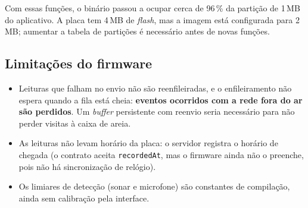 Com essas funções, o binário passou a ocupar cerca de 96\,\% da partição de 1\,MB do aplicativo. A placa tem 4\,MB de \textit{flash}, mas a imagem está configurada para 2\,MB; aumentar a tabela de partições é necessário antes de novas funções.

\subsection{Limitações do firmware}

\begin{itemize}
  \item Leituras que falham no envio não são reenfileiradas, e o enfileiramento não espera quando a fila está cheia: \textbf{eventos ocorridos com a rede fora do ar são perdidos}. Um \textit{buffer} persistente com reenvio seria necessário para não perder visitas à caixa de areia.
  \item As leituras não levam horário da placa: o servidor registra o horário de chegada (o contrato aceita \texttt{recordedAt}, mas o firmware ainda não o preenche, pois não há sincronização de relógio).
  \item Os limiares de detecção (sonar e microfone) são constantes de compilação, ainda sem calibração pela interface.
\end{itemize}
